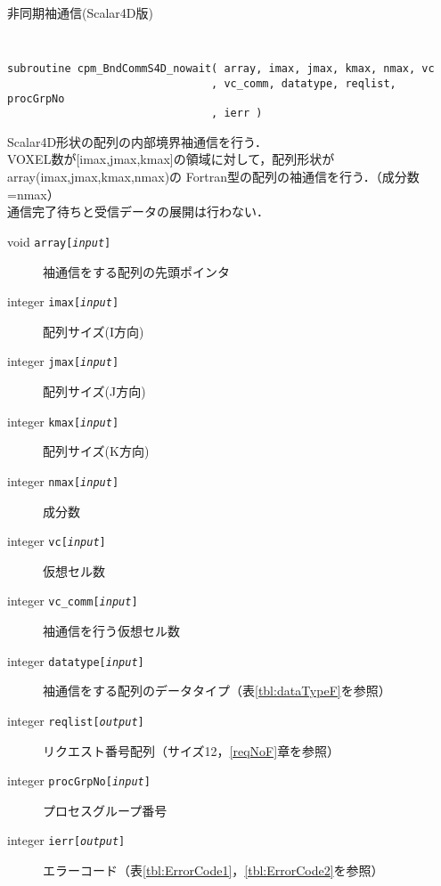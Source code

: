 \begin{spacing}{0.8}
\begin{itembox}[l]{非同期袖通信(Scalar4D版)}
{\tt
\begin{verbatim}
subroutine cpm_BndCommS4D_nowait( array, imax, jmax, kmax, nmax, vc
                                , vc_comm, datatype, reqlist, procGrpNo
                                , ierr )
\end{verbatim}
}
Scalar4D形状の配列の内部境界袖通信を行う．\\
VOXEL数が[imax,jmax,kmax]の領域に対して，配列形状がarray(imax,jmax,kmax,nmax)の
Fortran型の配列の袖通信を行う．（成分数=nmax）\\
通信完了待ちと受信データの展開は行わない．
\begin{description}
\item[void    {\tt array[{\it input}]}] 袖通信をする配列の先頭ポインタ
\item[integer {\tt imax[{\it input}]}] 配列サイズ(I方向)
\item[integer {\tt jmax[{\it input}]}] 配列サイズ(J方向)
\item[integer {\tt kmax[{\it input}]}] 配列サイズ(K方向)
\item[integer {\tt nmax[{\it input}]}] 成分数
\item[integer {\tt vc[{\it input}]}] 仮想セル数
\item[integer {\tt vc\_comm[{\it input}]}] 袖通信を行う仮想セル数
\item[integer {\tt datatype[{\it input}]}] 袖通信をする配列のデータタイプ（表\ref{tbl:dataTypeF}を参照）
\item[integer {\tt reqlist[{\it output}]}] リクエスト番号配列（サイズ12，\ref{reqNoF}章を参照）
\item[integer {\tt procGrpNo[{\it input}]}] プロセスグループ番号
\item[integer {\tt ierr[{\it output}]}] エラーコード（表\ref{tbl:ErrorCode1}，\ref{tbl:ErrorCode2}を参照）
\end{description}
\end{itembox}\\
\end{spacing}

